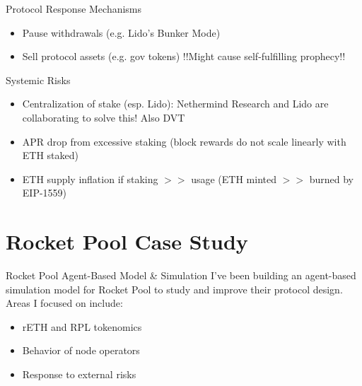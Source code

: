 \documentclass{beamer}
\begin{document}
\begin{frame}{Protocol Response Mechanisms}
    \begin{itemize}
        \item Pause withdrawals (e.g. Lido's Bunker Mode)
        \item Sell protocol assets (e.g. gov tokens) !!Might cause self-fulfilling prophecy!!
    \end{itemize}
\end{frame}

\begin{frame}{Systemic Risks}
    \begin{itemize}
        \item Centralization of stake (esp. Lido): Nethermind Research and Lido are collaborating to solve this! Also DVT
        \item APR drop from excessive staking (block rewards do not scale linearly with ETH staked)
        \item ETH supply inflation if staking $>>$ usage (ETH minted $>>$ burned by EIP-1559)
    \end{itemize}
\end{frame}

\section[Rocket Pool Case Study]{Rocket Pool Case Study}

\begin{frame}{Rocket Pool Agent-Based Model \& Simulation}
    I've been building an agent-based simulation model for Rocket Pool to study and improve their protocol design. Areas I focused on include:\\
    \begin{itemize}
        \item rETH and RPL tokenomics
        \item Behavior of node operators
        \item Response to external risks
    \end{itemize}
\end{frame}
\end{document}

